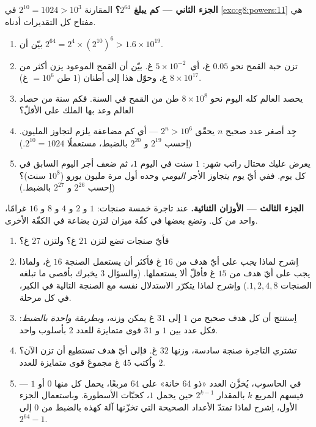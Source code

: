 \begin{problem}[{مسألة نهاية الأسبوع --- \omterm{def:g1:addition:def}{المجموع} الهندسي
$1 + 2 + 4 + \dots + 2^{n-1} = 2^n - 1$، من أسطورة مشهورة إلى
الأعداد الثنائية}]
\medskip
\noindent\textbf{الجزء الثاني --- كم يبلغ $2^{64}$؟}
المقارنة $2^{10} = 1024 > 10^3$ في
\cref{exo:g8:powers:11} هي مفتاح كل التقديرات أدناه.
\begin{enumerate}[resume]
  \item بيّن أن
        $2^{64} = 2^4 \times \left(2^{10}\right)^6 > 1.6 \times
        10^{19}$.
  \item تزن حبة القمح نحو $0.05$ غ، أي\
        $5 \times 10^{-2}$ غ. بيّن أن القمح الموعود يزن
        أكثر من $8 \times 10^{17}$ غ، وحوّل هذا إلى
        أطنان ($1$ طن $= 10^6$ غ).
  \item يحصد العالم كله اليوم نحو $8 \times 10^8$
        طن من القمح في السنة. فكم سنة من حصاد العالم
        وعد بها الملك على الأقلّ؟
  \item جِد أصغر عدد صحيح $n$ يحقّق
        $2^n > 10^6$ --- أي كم مضاعفة يلزم
        لتجاوز المليون. (اِحسب $2^{19}$ و $2^{20}$ بالضبط،
        مستعملًا $2^{10} = 1024$.)
  \item يعرض عليك محتال راتب شهر: $1$ سنت في اليوم
        $1$، ثم ضعف أجر اليوم السابق في كل يوم. ففي أيّ
        يوم يتجاوز الأجر \emph{اليومي} وحده أول مرة مليون
        يورو ($10^8$ سنت)؟ (اِحسب $2^{26}$ و
        $2^{27}$ بالضبط.)
\end{enumerate}

\medskip
\noindent\textbf{الجزء الثالث --- الأوزان الثنائية.}
عند تاجرة خمسة صنجات: $1$ و $2$ و $4$ و $8$ و $16$ غرامًا،
واحد من كل. وتضع بعضها في كفّة ميزان
لتزن بضاعة في الكفّة الأخرى.
\begin{enumerate}[resume]
  \item فأيّ صنجات تضع لتزن $21$ غ؟ ولتزن
        $27$ غ؟
  \item اِشرح لماذا \emph{يجب} على أيّ هدف من $16$ غ فأكثر أن
        يستعمل الصنجة $16$ غ، ولماذا يجب على أيّ هدف من $15$ غ فأقلّ
        ألا يستعملها. (والسؤال 3 يخبرك بأقصى ما تبلغه
        الصنجات $1, 2, 4, 8$.) واِشرح لماذا يتكرّر
        الاستدلال نفسه مع الصنجة التالية في الكبر، في
        كل مرحلة.
  \item اِستنتج أن كل هدف صحيح من $1$ إلى $31$ غ يمكن
        وزنه، و\emph{بطريقة واحدة بالضبط}: فكل عدد
        بين $1$ و $31$  قوى متمايزة للعدد $2$ بأسلوب
        واحد.
  \item تشتري التاجرة صنجة سادسة، وزنها $32$ غ. فإلى أيّ
        هدف تستطيع أن تزن الآن؟ واُكتب $45$ غ مجموعَ
        قوى متمايزة للعدد $2$.
  \item في الحاسوب، يُخزَّن العدد «ذو 64 خانة» على $64$
        مربعًا، يحمل كل منها $0$ أو $1$ --- فيسهم المربع $k$
        بالمقدار $2^{k-1}$ حين يحمل $1$، كحبّات
        الأسطورة. وباستعمال الجزء الأول، اِشرح لماذا تمتدّ الأعداد
        الصحيحة التي تخزّنها آلة كهذه بالضبط من $0$ إلى
        $2^{64} - 1$.
\end{enumerate}
\end{problem}
